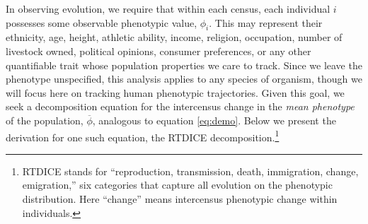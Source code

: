 \documentclass[11pt]{article}
\begin{document}
In observing evolution, we require that within each census, each individual $i$ possesses some observable phenotypic value, $\phi_i$.  This may represent their ethnicity, age, height, athletic ability, income, religion, occupation, number of livestock owned, political opinions, consumer preferences, or any other quantifiable trait whose population properties we care to track.  Since we leave the phenotype unspecified, this analysis applies to any species of organism, though we will focus here on tracking human phenotypic trajectories.  Given this goal, we seek a decomposition equation for the intercensus change in the \textit{mean phenotype} of the population, $\overline{\phi}$, analogous to equation \ref{eq:demo}.  Below we present the derivation for one such equation, the RTDICE decomposition.\footnote{RTDICE stands for ``reproduction, transmission, death, immigration, change, emigration,'' six categories that capture all evolution on the phenotypic distribution.  Here ``change'' means intercensus phenotypic change within individuals.}
\end{document}

